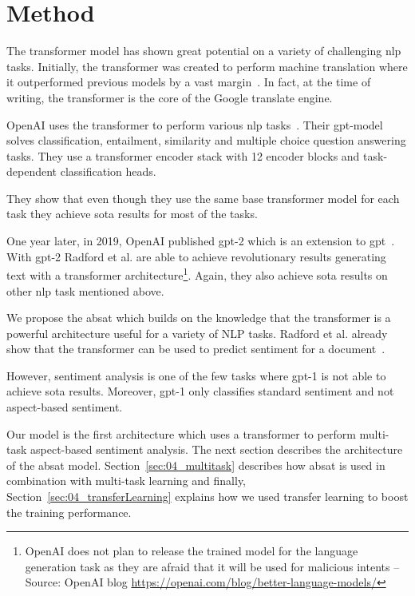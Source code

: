 \chapter{Method}
\label{ch:method}

The transformer model has shown great potential on a variety of challenging \gls{nlp} tasks. Initially, the transformer was created to perform machine translation where it outperformed previous models by a vast margin~\cite{Vaswani2017}. In fact, at the time of writing, the transformer is the core of the Google translate engine.
\medskip

OpenAI uses the transformer to perform various \gls{nlp} tasks~\cite{Radford2018}. Their \gls{gpt}-model solves classification, entailment, similarity and multiple choice question answering tasks. They use a transformer encoder stack with 12 encoder blocks and task-dependent classification heads. 

They show that even though they use the same base transformer model for each task they achieve \gls{sota} results for most of the tasks.
\medskip

One year later, in 2019, OpenAI published \gls{gpt}-2 which is an extension to \gls{gpt}~\cite{Radford2019}. With \gls{gpt}-2 Radford et al. are able to achieve revolutionary results generating text with a transformer architecture\footnote{OpenAI does not plan to release the trained model for the language generation task as they are afraid that it will be used for malicious intents -- Source: OpenAI blog \url{https://openai.com/blog/better-language-models/}}. Again, they also achieve \gls{sota} results on other \gls{nlp} task mentioned above.
\bigskip

We propose the \acrfull{absat} which builds on the knowledge that the transformer is a powerful architecture useful for a variety of NLP tasks. Radford et al. already show that the transformer can be used to predict sentiment for a document~\cite{Radford2018}. 

However, sentiment analysis is one of the few tasks where \gls{gpt}-1 is not able to achieve \gls{sota} results. Moreover, \gls{gpt}-1 only classifies standard sentiment and not aspect-based sentiment.
\medskip

Our model is the first architecture which uses a transformer to perform multi-task aspect-based sentiment analysis. The next section describes the architecture of the \gls{absat} model. Section~\ref{sec:04_multitask} describes how \gls{absat} is used in combination with multi-task learning and finally, Section~\ref{sec:04_transferLearning} explains how we used transfer learning to boost the training performance.

